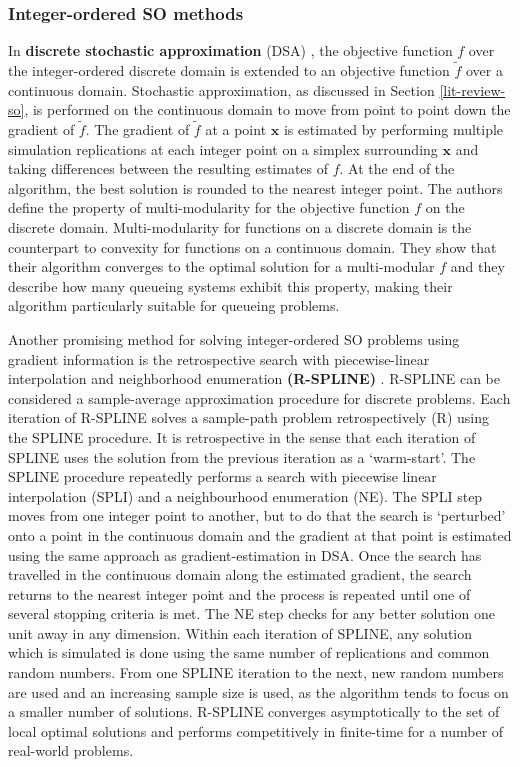\documentclass[12pt,a4paper]{article}
\begin{document}
\subsubsection{Integer-ordered SO methods} \label{int-ordered-so}
%
In \textbf{discrete stochastic approximation} (DSA) \citep{lim2012stochastic}, the objective function $f$ over the integer-ordered discrete domain is extended to an objective function $\tilde{f}$ over a continuous domain. Stochastic approximation, as discussed in Section \ref{lit-review-so}, is performed on the continuous domain to move from point to point down the gradient of $\tilde{f}$. The gradient of $\tilde{f}$ at a point $\boldsymbol{x}$ is estimated by performing multiple simulation replications at each integer point on a simplex surrounding $\boldsymbol{x}$ and taking differences between the resulting estimates of $f$. At the end of the algorithm, the best solution is rounded to the nearest integer point. The authors define the property of multi-modularity for the objective function $f$ on the discrete domain. Multi-modularity for functions on a discrete domain is the counterpart to convexity for functions on a continuous domain. They show that their algorithm converges to the optimal solution for a multi-modular $f$ and they describe how many queueing systems exhibit this property, making their algorithm particularly suitable for queueing problems.

Another promising method for solving integer-ordered SO problems using gradient information is the retrospective search with piecewise-linear interpolation and neighborhood enumeration \textbf{(R-SPLINE)} \citep{wang2013integer}. R-SPLINE can be considered a sample-average approximation procedure for discrete problems. Each iteration of R-SPLINE solves a sample-path problem retrospectively (R) using the SPLINE procedure. It is retrospective in the sense that each iteration of SPLINE uses the solution from the previous iteration as a `warm-start'. The SPLINE procedure repeatedly performs a search with piecewise linear interpolation (SPLI) and a neighbourhood enumeration (NE). The SPLI step moves from one integer point to another, but to do that the search is `perturbed' onto a point in the continuous domain and the gradient at that point is estimated using the same approach as gradient-estimation in DSA. Once the search has travelled in the continuous domain along the estimated gradient, the search returns to the nearest integer point and the process is repeated until one of several stopping criteria is met. The NE step checks for any better solution one unit away in any dimension. Within each iteration of SPLINE, any solution which is simulated is done using the same number of replications and common random numbers. From one SPLINE iteration to the next, new random numbers are used and an increasing sample size is used, as the algorithm tends to focus on a smaller number of solutions. R-SPLINE converges asymptotically to the set of local optimal solutions and performs competitively in finite-time for a number of real-world problems. 
\end{document}
